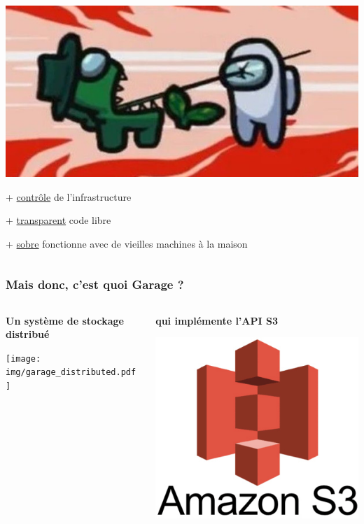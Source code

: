 \documentclass[aspectratio=169]{beamer}
\begin{document}
\begin{frame}[t]
\begin{columns}[t]
\begin{column}{0.5\textwidth}
	\begin{center}
		\includegraphics[scale=1]{img/death.jpg}
	\end{center}
	
	\vspace{0.4cm}
	
	+ \underline{contrôle} de l'infrastructure
	
	+ \underline{transparent} code libre 
	
	+ \underline{sobre} fonctionne avec de vieilles machines à la maison
	\end{column}
	\end{columns}

\end{frame}


\graphicspath{{img/}}

\begin{frame}
	\frametitle{Mais donc, c'est quoi Garage ?}

	\begin{columns}[t]
	\begin{column}{0.5\textwidth}
		\centering
		\textbf{Un système de stockage distribué}
		\vspace{1em}

			\texttt{[image: img/garage\_distributed.pdf]}
	\end{column}
	\pause

	\begin{column}{0.5\textwidth}
		\centering
		\textbf{qui implémente l'API S3}
		\vspace{2em}

		\includegraphics[width=.7\columnwidth]{img/Amazon-S3.jpg}
	\end{column}
	\end{columns}
\end{frame}
\end{document}
